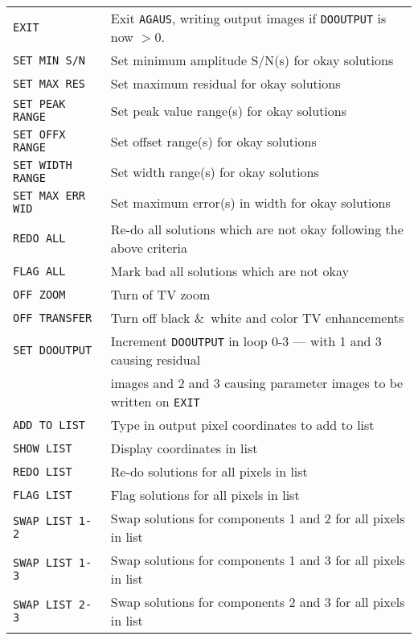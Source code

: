 \documentclass[twoside]{article}
\begin{document}
\begin{center}
\begin{tabular}{|l|l|}\hline
 {\tt EXIT           } & Exit {\tt AGAUS}, writing output images if
                         {\tt DOOUTPUT} is now $> 0.$\\
 {\tt SET MIN S/N    } & Set minimum amplitude S/N(s) for okay
                         solutions\\
 {\tt SET MAX RES    } & Set maximum residual for okay solutions\\
 {\tt SET PEAK RANGE } & Set peak value range(s) for okay solutions\\
 {\tt SET OFFX RANGE } & Set offset range(s) for okay solutions\\
 {\tt SET WIDTH RANGE} & Set width range(s) for okay solutions\\
 {\tt SET MAX ERR WID} & Set maximum error(s) in width for okay
                         solutions\\
 {\tt REDO ALL       } & Re-do all solutions which are not okay
                         following the above criteria\\
 {\tt FLAG ALL       } & Mark bad all solutions which are not okay\\
 {\tt OFF ZOOM       } & Turn of TV zoom\\
 {\tt OFF TRANSFER   } & Turn off black \&\ white and color TV
                         enhancements\\
 {\tt SET DOOUTPUT   } & Increment {\tt DOOUTPUT} in loop 0-3 --- with
                         1 and 3 causing residual\\
                       & images and 2 and 3 causing parameter images
                         to be written on {\tt EXIT}\\
 {\tt ADD TO LIST    } & Type in output pixel coordinates to add to
                         list\\
 {\tt SHOW LIST      } & Display coordinates in list\\
 {\tt REDO LIST      } & Re-do solutions for all pixels in list\\
 {\tt FLAG LIST      } & Flag solutions for all pixels in list\\
 {\tt SWAP LIST 1-2  } & Swap solutions for components 1 and 2 for all
                         pixels in list\\
 {\tt SWAP LIST 1-3  } & Swap solutions for components 1 and 3 for all
                         pixels in list\\
 {\tt SWAP LIST 2-3  } & Swap solutions for components 2 and 3 for all
                         pixels in list\\ \hline
\end{tabular}
\end{center}
\end{document}

